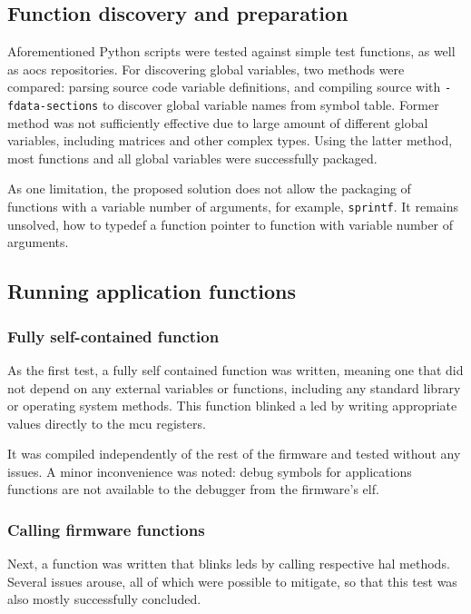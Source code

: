 \subsection{Function discovery and preparation}

Aforementioned Python scripts were tested against simple test functions, as well as \gls{aocs} repositories. For discovering global variables, two methods were compared: parsing source code variable definitions, and compiling source with \texttt{-fdata-sections} to discover global variable names from symbol table. Former method was not sufficiently effective due to large amount of different global variables, including matrices and other complex types. Using the latter method, most functions and all global variables were successfully packaged.

As one limitation, the proposed solution does not allow the packaging of functions with a variable number of arguments, for example, \texttt{sprintf}. It remains unsolved, how to typedef a function pointer to function with variable number of arguments.

\subsection{Running application functions}

\subsubsection{Fully self-contained function}

As the first test, a fully self contained function was written, meaning one that did not depend on any external variables or functions, including any standard library or operating system methods. This function blinked a \gls{led} by writing appropriate values directly to the \gls{mcu} registers.

It was compiled independently of the rest of the firmware and tested without any issues. A minor inconvenience was noted: debug symbols for applications functions are not available to the debugger from the firmware's \gls{elf}.

\subsubsection{Calling firmware functions}

Next, a function was written that blinks \glspl{led} by calling respective \gls{hal} methods. Several issues arouse, all of which were possible to mitigate, so that this test was also mostly successfully concluded.

